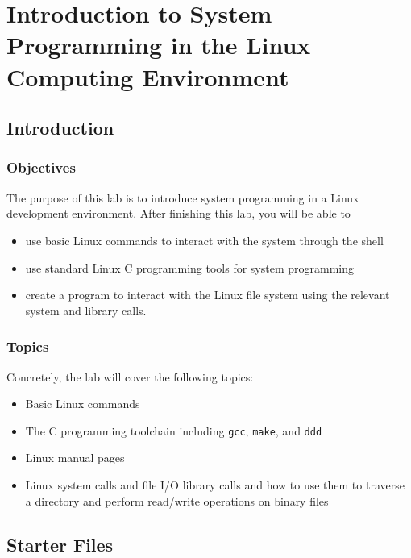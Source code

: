 \chapter{Introduction to System Programming in the Linux Computing Environment}
\section{Introduction}
\subsection{Objectives}
The purpose of this lab is to introduce system programming in a Linux development environment. After finishing this lab, you will be able to
\begin{itemize}
   \item use basic Linux commands to interact with the system through the shell
   \item use standard Linux C programming tools for system programming
   \item create a program to interact with the Linux file system using the relevant system and library calls.
\end{itemize}

\subsection{Topics}
Concretely, the lab will cover the following topics:
\begin{itemize}
  \item Basic Linux commands
  \item The C programming toolchain including \verb+gcc+, \verb+make+, and \verb+ddd+
  \item Linux manual pages
  \item Linux system calls and file I/O library calls and how to use them to traverse a directory and perform read/write operations on binary files
  \end{itemize}
  
\section{Starter Files}

